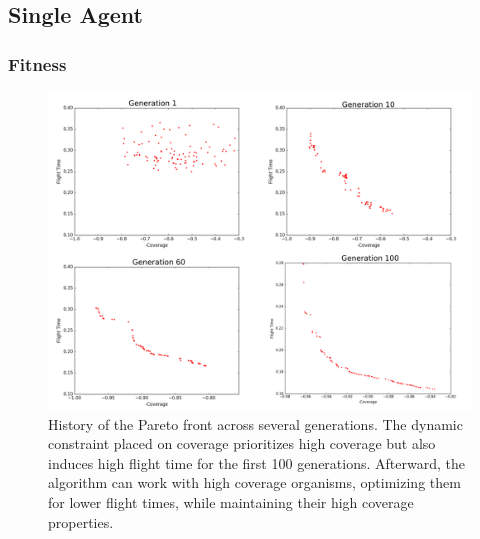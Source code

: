 \documentclass[letterpaper, 10 pt, conference]{ieeeconf}  %
\begin{document}
\subsection{Single Agent}
\subsubsection{Fitness}

\begin{figure}
\centering
\includegraphics[width=1.0\linewidth]{figures/pareto_history3.png}
\caption{History of the Pareto front across several generations. The dynamic constraint placed on coverage prioritizes high coverage but also induces high flight time for the first 100 generations. Afterward, the algorithm can work with high coverage organisms, optimizing them for lower flight times, while maintaining their high coverage properties.}
\label{fig:pareto_cheetos}
\end{figure}
\end{document}
